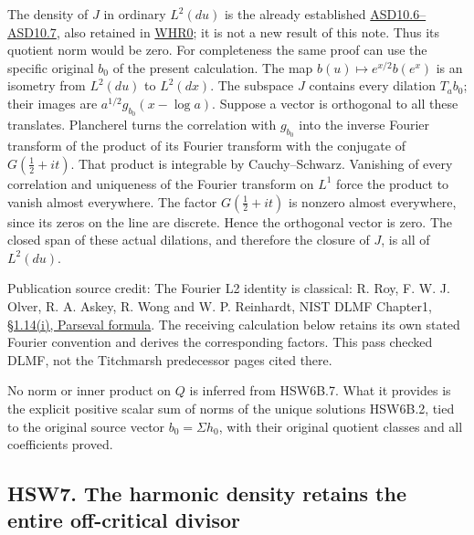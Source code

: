 The density of \(J\) in ordinary \(L^2(du)\) is the already established
\href{https://github.com/KokunoYumeto/zeta-function-research-reader/blob/36a82ecca98addb8a98b48204e349737856c7223/workbenches/splitzero-tandem/continuations/20260924-cohomology-weight-and-character-lifts/original-character-lifting/tau_lifting_weights_20260924/ACTUAL_SUPPORTED_DUALITY_INDEPENDENT.md}{ASD10.6--ASD10.7},
also retained in
\href{https://github.com/KokunoYumeto/zeta-function-research-reader/blob/main/workbenches/splitzero-tandem/continuations/20260925-full-source-tensor-and-original-divisor/counterfactual/WEIGHTED_HILBERT_RETURN_AND_EXACT_KERNEL.md}{WHR0};
it is not a new result of this note. Thus its quotient norm would be
zero. For completeness the same proof can use the specific original
\(b_0\) of the present calculation. The map
\(b(u)\mapsto e^{x/2}b(e^x)\) is an isometry from \(L^2(du)\) to
\(L^2(dx)\). The subspace \(J\) contains every dilation \(T_a b_0\);
their images are \(a^{1/2}g_{b_0}(x-\log a)\). Suppose a vector is
orthogonal to all these translates. Plancherel turns the correlation
with \(g_{b_0}\) into the inverse Fourier transform of the product of
its Fourier transform with the conjugate of \(G(\tfrac12+it)\). That
product is integrable by Cauchy--Schwarz. Vanishing of every correlation
and uniqueness of the Fourier transform on \(L^1\) force the product to
vanish almost everywhere. The factor \(G(\tfrac12+it)\) is nonzero
almost everywhere, since its zeros on the line are discrete. Hence the
orthogonal vector is zero. The closed span of these actual dilations,
and therefore the closure of \(J\), is all of \(L^2(du)\).

Publication source credit: The Fourier L2 identity is classical: R. Roy,
F. W. J. Olver, R. A. Askey, R. Wong and W. P. Reinhardt, NIST DLMF
Chapter1, \href{https://dlmf.nist.gov/1.14\#i}{§1.14(i), Parseval
formula}. The receiving calculation below retains its own stated Fourier
convention and derives the corresponding factors. This pass checked
DLMF, not the Titchmarsh predecessor pages cited there.

No norm or inner product on \(Q\) is inferred from HSW6B.7. What it
provides is the explicit positive scalar sum of norms of the unique
solutions HSW6B.2, tied to the original source vector
\(b_0=\Sigma h_0\), with their original quotient classes and all
coefficients proved.

\subsection{HSW7. The harmonic density retains the entire off-critical
divisor}\label{hsw7.-the-harmonic-density-retains-the-entire-off-critical-divisor}

